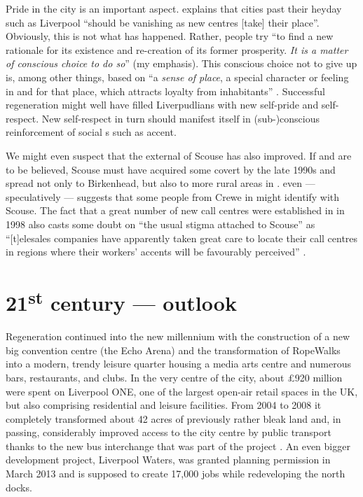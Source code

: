 Pride in the city is an important aspect.
\citet[20]{fraser2003} explains that cities past their heyday such as Liverpool ``should be vanishing as new centres [take] their place''.
Obviously, this is not what has happened.
Rather, people try ``to find a new rationale for its existence and re-creation of its former prosperity. \emph{It is a matter of conscious choice to do so}'' (my emphasis).
This conscious choice not to give up is, among other things, based on ``a \emph{sense of place}, a special character or feeling in and for that place, which attracts loyalty from inhabitants'' \citep[23, emphasis in the original]{fraser2003}.
Successful regeneration might well have filled Liverpudlians with new self-pride and self-respect.
New self-respect in turn should manifest itself in (sub-)conscious reinforcement of social s such as accent.

We might even suspect that the external  of Scouse has also improved.
If \citet[73]{trudgill1999} and \citet[110]{honeybone2007} are to be believed, Scouse must have acquired some covert  by the late 1990s and spread not only to Birkenhead, but also to more rural areas in .
\citet[176--177]{montgomery2007a} even --- speculatively --- suggests that some people from Crewe in  might identify with Scouse.
The fact that a great number of new call centres were established in  in 1998 also casts some doubt on ``the usual stigma attached to Scouse'' as ``[t]elesales companies have apparently taken great care to locate their call centres in regions where their workers' accents will be favourably perceived'' \citep[3]{foulkesdocherty1999a}.

	\section{21\textsuperscript{st} century --- outlook}\label{sec.hist.21}

Regeneration continued into the new millennium with the construction of a new big convention centre (the Echo Arena) and the transformation of RopeWalks into a modern, trendy leisure quarter housing a media arts centre and numerous bars, restaurants, and clubs.
In the very centre of the city, about £920 million were spent on Liverpool ONE, one of the largest open-air retail spaces in the UK, but also comprising residential and leisure facilities.
From 2004 to 2008 it completely transformed about 42 acres of previously rather bleak land and, in passing, considerably improved access to the city centre by public transport thanks to the new bus interchange that was part of the project \parencite[cf.][478--479]{murden2006}.
An even bigger development project, Liverpool Waters, was granted planning permission in March 2013 and is supposed to create 17,000 jobs while redeveloping the north docks.

